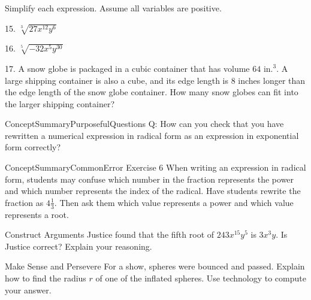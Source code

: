 \documentclass{article}
\newenvironment{concept-summary}{}{}    %
\newenvironment{practice}[2]{}{}        %
\newenvironment{te-addendum}[2]{}{}     %
\newcommand{\answer}[1]{}               %
\newcommand{\placeholder}[2]{}          %
\begin{document}
\begin{concept-summary}
Simplify each expression. Assume all variables are positive.

15. \(\sqrt[3]{27x^{12}y^6}\)

\answer{\(3x^4y^2\)}

16. \(\sqrt[5]{-32x^5y^{30}}\)

\answer{\(-2xy^6\)}

17. A snow globe is packaged in a cubic container that has volume \(64\text{ in.}^3\). A large shipping container is also a cube, and its edge length is 8 inches longer than the edge length of the snow globe container. How many snow globes can fit into the larger shipping container?

\answer{27}
\end{concept-summary}

\begin{te-addendum}{ConceptSummary}{PurposefulQuestions}
Q: How can you check that you have rewritten a numerical expression in radical form as an expression in exponential form correctly?

\answer{You can evaluate each expression. If the expressions are equal, you have rewritten them correctly.}
\end{te-addendum}

\begin{te-addendum}{ConceptSummary}{CommonError}
Exercise 6 When writing an expression in radical form, students may confuse which number in the fraction represents the power and which number represents the index of the radical. Have students rewrite the fraction as \(4\frac13\). Then ask them which value represents a power and which value represents a root.
\end{te-addendum}

\begin{practice}{18}{2}
Construct Arguments Justice found that the fifth root of \(243x^{15}y^5\) is \(3x^3y\). Is Justice correct? Explain your reasoning.

\answer{Yes, Justice is correct; \((3x^3y)^5=3^5(x^3)^5y^5=243x^{15}y^5\).}
\end{practice}

\begin{practice}{19}{2}
Make Sense and Persevere For a show, spheres were bounced and passed. Explain how to find the radius \(r\) of one of the inflated spheres. Use technology to compute your answer.

\placeholder{photo}{Stage show with many inflated spheres in the air. Label: "Volume of a sphere is 4,186 2/3 in.^3."}

\answer{Use the volume formula to solve for \(r\). Divide \(4,186\frac23\) by \(\frac43\) and the result by \(\pi\approx3.14\). This leaves \(1,000\approx r^3\). The cube root of 1,000 is 10, so the radius is approximately 10 in.}
\end{practice}
\end{document}
